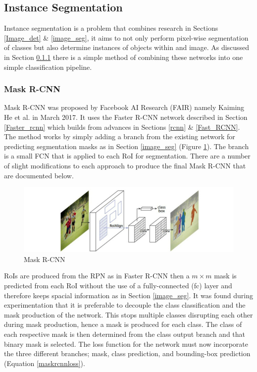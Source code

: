 \documentclass[11pt,twoside]{report}
\begin{document}
\subsection{Instance Segmentation}
Instance segmentation is a problem that combines research in Sections \ref{Image_det} \& \ref{image_seg}, it aims to not only perform pixel-wise segmentation of classes but also determine instances of objects within and image. As discussed in Section \ref{mask_rcnn} there is a simple method of combining these networks into one simple classification pipeline.
\subsubsection{Mask R-CNN} \label{mask_rcnn}
Mask R-CNN was proposed by Facebook AI Research (FAIR) namely Kaiming He et al. in March 2017. It uses the Faster R-CNN network described in Section \ref{Faster_rcnn} which builds from advances in Sections \ref{rcnn}  \& \ref{Fast_RCNN}. The method works by simply adding a branch from the existing network for predicting segmentation masks as in Section \ref{image_seg} (Figure \ref{Mask_rcnn_arch}). The branch is a small FCN that is applied to each RoI for segmentation. There are a number of slight modifications to each approach to produce the final Mask R-CNN that are documented below.
\newline \newline

\noindent \begin{figure}[h!]
	\includegraphics[width = 1.0\hsize]{./figures/mask_arch.jpg}
	\caption{Mask R-CNN \cite{DBLP:journals/corr/HeGDG17}}
	\label{Mask_rcnn_arch}
\end{figure}
RoIs are produced from the RPN as in Faster R-CNN \cite{DBLP:journals/corr/RenHG015} then a $m \times m$ mask is predicted from each RoI without the use of a fully-connected (fc) layer and therefore keeps spacial information as in Section \ref{image_seg}. It was found during experimentation that it is preferable to decouple the class classification and the mask production of the network. This stops multiple classes disrupting each other during mask production, hence a mask is produced for each class. The class of each respective mask is then determined from the class output branch and that binary mask is selected. 
\newline \newline
The loss function for the network must now incorporate the three different branches; mask, class prediction, and bounding-box prediction (Equation \ref{maskrcnnloss}). 
\end{document}
